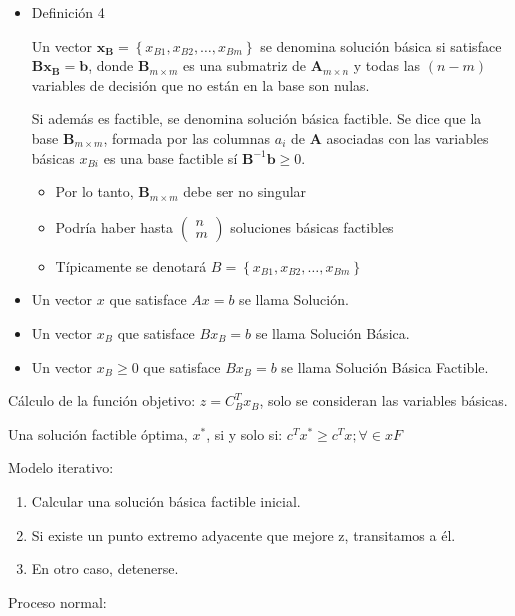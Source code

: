 \documentclass[12pt, twoside, openright]{report} %
\begin{document}
\begin{itemize}
	\item Definición 4

	      Un vector $\mathbf{x}_{\mathbf{B}}=\left\{x_{B 1}, x_{B 2}, \ldots, x_{B m}\right\}$ se denomina solución básica si satisface $\mathbf{B x}_{\mathbf{B}}=\mathbf{b}$, donde $\mathbf{B}_{m \times m}$ es una submatriz de $\mathbf{A}_{m \times n}$ y todas las $(n-m)$ variables de decisión que no están en la base son nulas.

	      Si además es factible, se denomina solución básica factible. Se dice que la base $\mathbf{B}_{m \times m}$, formada por las columnas $a_{i}$ de $\mathbf{A}$ asociadas con las variables básicas $x_{B i}$ es una base factible sí $\mathbf{B}^{-1} \mathbf{b} \geq 0$.
	      \begin{itemize}
		      \item Por lo tanto, $\mathbf{B}_{m \times m}$ debe ser no singular
		      \item Podría haber hasta $\left(\begin{array}{l}n \\ m\end{array}\right)$ soluciones básicas factibles
		      \item Típicamente se denotará $B=\left\{x_{B 1}, x_{B 2}, \ldots, x_{B m}\right\}$
	      \end{itemize}
	\item Un vector \(x\) que satisface \(Ax=b\) se llama Solución.
	\item Un vector \(x_B\) que satisface \(Bx_B=b\) se llama Solución Básica.
	\item Un vector \(x_B \geq 0\) que satisface \(Bx_B=b\) se llama Solución Básica Factible.
\end{itemize}


Cálculo de la función objetivo: \(z=C_B^Tx_B\), solo se consideran
las variables básicas.

Una solución factible óptima, \(x^*\), si y solo si:
\(c^Tx^* \geq c^Tx; \forall \in xF\)

Modelo iterativo:

\begin{enumerate}
	\def\labelenumi{\arabic{enumi}.}
	\item Calcular una solución básica factible inicial.
	\item Si existe un punto extremo adyacente que mejore z, transitamos a
	      él.
	\item En otro caso, detenerse.
\end{enumerate}
\pagebreak
Proceso normal:
\end{document}
